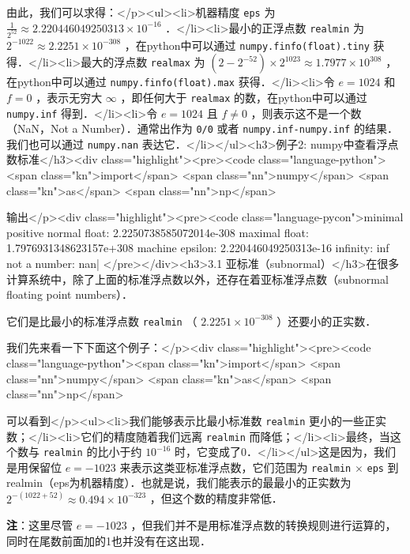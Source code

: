 由此，我们可以求得：</p><ul><li>机器精度 \verb|eps| 为  $\frac{1}{2^{52}}\approx 2.220446049250313\times10^{-16}$  ．</li><li>最小的正浮点数 \verb|realmin| 为  $2^{-1022}\approx2.2251\times10^{-308}$  ，在python中可以通过 \verb|numpy.finfo(float).tiny| 获得．</li><li>最大的浮点数 \verb|realmax| 为 $(2-2^{-52})\times2^{1023}\approx1.7977\times10^{308}$  ，在python中可以通过 \verb|numpy.finfo(float).max| 获得．</li><li>令  $e=1024$  和  $f=0$  ，表示无穷大  $\infty$  ，即任何大于 \verb|realmax| 的数，在python中可以通过 \verb|numpy.inf| 得到．</li><li>令  $e=1024$  且  $f\neq0$  ，则表示这不是一个数（NaN，Not a Number）．通常出作为 \verb|0/0| 或者 \verb|numpy.inf-numpy.inf| 的结果．我们也可以通过 \verb|numpy.nan| 表达它．</li></ul><h3>例子2: numpy中查看浮点数标准</h3><div class="highlight"><pre><code class="language-python"><span class="kn">import</span> <span class="nn">numpy</span> <span class="kn">as</span> <span class="nn">np</span>


输出</p><div class="highlight"><pre><code class="language-pycon">minimal positive normal float: 2.2250738585072014e-308 
maximal float: 1.7976931348623157e+308 
machine epsilon: 2.220446049250313e-16 
infinity: inf 
not a number: nan| </pre></div><h3>3.1 亚标准（subnormal）</h3>在很多计算系统中，除了上面的标准浮点数以外，还存在着亚标准浮点数（subnormal floating point numbers）． 

它们是比最小的标准浮点数 \verb|realmin| （  $2.2251\times10^{-308}$  ）还要小的正实数．

我们先来看一下下面这个例子：</p><div class="highlight"><pre><code class="language-python"><span class="kn">import</span> <span class="nn">numpy</span> <span class="kn">as</span> <span class="nn">np</span>

可以看到</p><ul><li>我们能够表示比最小标准数 \verb|realmin| 更小的一些正实数；</li><li>它们的精度随着我们远离 \verb|realmin| 而降低；</li><li>最终，当这个数与 \verb|realmin| 的比小于约  $10^{-16}$  时，它变成了0．</li></ul>这是因为，我们是用保留位  $e=-1023$  来表示这类亚标准浮点数，它们范围为 \verb|realmin|   $\times$   \verb|eps| 到realmin（eps为机器精度）．也就是说，我们能表示的最最小的正实数为  $2^{-(1022+52)}\approx 0.494\times10^{-323}$  ，但这个数的精度非常低．

\textbf{注}：这里尽管  $e=-1023$  ，但我们并不是用标准浮点数的转换规则进行运算的，同时在尾数前面加的1也并没有在这出现．

